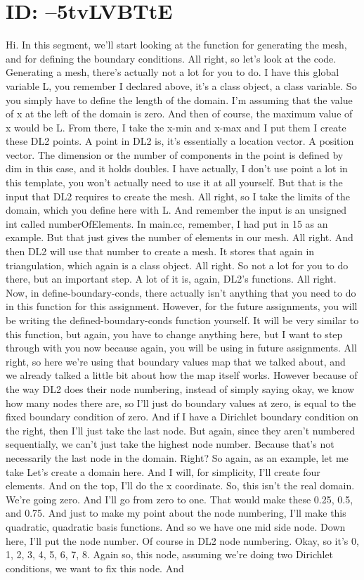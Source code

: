 \documentclass[10pt]{article}
\begin{document}
{\section*{ID: --5tvLVBTtE}
Hi. In this segment, we'll start looking at the function for generating the mesh, and for defining the boundary conditions. All right, so let's look at the code. Generating a mesh, there's actually not a lot for you to do. I have this global variable L, you remember I declared above, it's a class object, a class variable. So you simply have to define the length of the domain. I'm assuming that the value of x at the left of the domain is zero. And then of course, the maximum value of x would be L. From there, I take the x-min and x-max and I put them I create these DL2 points. A point in DL2 is, it's essentially a location vector. A position vector. The dimension or the number of components in the point is defined by dim in this case, and it holds doubles. I have actually, I don't use point a lot in this template, you won't actually need to use it at all yourself. But that is the input that DL2 requires to create the mesh. All right, so I take the limits of the domain, which you define here with L. And remember the input is an unsigned int called numberOfElements. In main.cc, remember, I had put in 15 as an example. But that just gives the number of elements in our mesh. All right. And then DL2 will use that number to create a mesh. It stores that again in triangulation, which again is a class object. All right. So not a lot for you to do there, but an important step. A lot of it is, again, DL2's functions. All right. Now, in define-boundary-conds, there actually isn't anything that you need to do in this function for this assignment. However, for the future assignments, you will be writing the defined-boundary-conds function yourself. It will be very similar to this function, but again, you have to change anything here, but I want to step through with you now because again, you will be using in future assignments. All right, so here we're using that boundary values map that we talked about, and we already talked a little bit about how the map itself works. However because of the way DL2 does their node numbering, instead of simply saying okay, we know how many nodes there are, so I'll just do boundary values at zero, is equal to the fixed boundary condition of zero. And if I have a Dirichlet boundary condition on the right, then I'll just take the last node. But again, since they aren't numbered sequentially, we can't just take the highest node number. Because that's not necessarily the last node in the domain. Right? So again, as an example, let me take Let's create a domain here. And I will, for simplicity, I'll create four elements. And on the top, I'll do the x coordinate. So, this isn't the real domain. We're going zero. And I'll go from zero to one. That would make these 0.25, 0.5, and 0.75. And just to make my point about the node numbering, I'll make this quadratic, quadratic basis functions. And so we have one mid side node. Down here, I'll put the node number. Of course in DL2 node numbering. Okay, so it's 0, 1, 2, 3, 4, 5, 6, 7, 8. Again so, this node, assuming we're doing two Dirichlet conditions, we want to fix this node. And }
\end{document}
